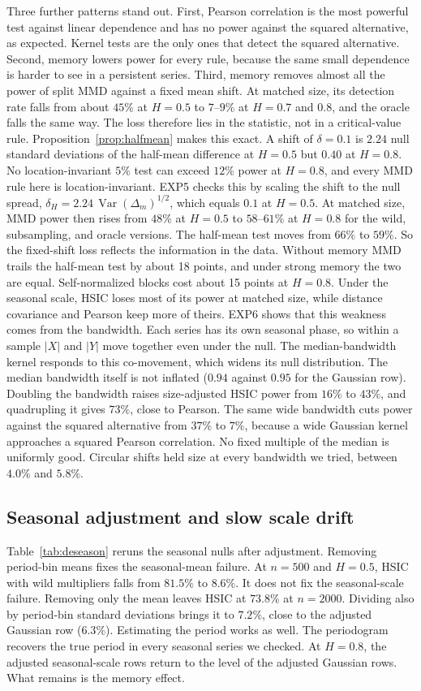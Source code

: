 \documentclass[11pt]{article}
\theoremstyle{remark}
\newcommand{\Var}{\operatorname{Var}}
\begin{document}
Three further patterns stand out. First, Pearson correlation is the most powerful test against linear dependence and has no power against the squared alternative, as expected. Kernel tests are the only ones that detect the squared alternative. Second, memory lowers power for every rule, because the same small dependence is harder to see in a persistent series. Third, memory removes almost all the power of split MMD against a fixed mean shift. At matched size, its detection rate falls from about $45\%$ at $H=0.5$ to $7$--$9\%$ at $H=0.7$ and $0.8$, and the oracle falls the same way. The loss therefore lies in the statistic, not in a critical-value rule. Proposition~\ref{prop:halfmean} makes this exact. A shift of $\delta=0.1$ is $2.24$ null standard deviations of the half-mean difference at $H=0.5$ but $0.40$ at $H=0.8$. No location-invariant $5\%$ test can exceed $12\%$ power at $H=0.8$, and every MMD rule here is location-invariant. EXP5 checks this by scaling the shift to the null spread, $\delta_H=2.24\,\Var(\Delta_m)^{1/2}$, which equals $0.1$ at $H=0.5$. At matched size, MMD power then rises from $48\%$ at $H=0.5$ to $58$--$61\%$ at $H=0.8$ for the wild, subsampling, and oracle versions. The half-mean test moves from $66\%$ to $59\%$. So the fixed-shift loss reflects the information in the data. Without memory MMD trails the half-mean test by about 18 points, and under strong memory the two are equal. Self-normalized blocks cost about 15 points at $H=0.8$. Under the seasonal scale, HSIC loses most of its power at matched size, while distance covariance and Pearson keep more of theirs. EXP6 shows that this weakness comes from the bandwidth. Each series has its own seasonal phase, so within a sample $|X|$ and $|Y|$ move together even under the null. The median-bandwidth kernel responds to this co-movement, which widens its null distribution. The median bandwidth itself is not inflated ($0.94$ against $0.95$ for the Gaussian row). Doubling the bandwidth raises size-adjusted HSIC power from $16\%$ to $43\%$, and quadrupling it gives $73\%$, close to Pearson. The same wide bandwidth cuts power against the squared alternative from $37\%$ to $7\%$, because a wide Gaussian kernel approaches a squared Pearson correlation. No fixed multiple of the median is uniformly good. Circular shifts held size at every bandwidth we tried, between $4.0\%$ and $5.8\%$.

\subsection{Seasonal adjustment and slow scale drift}\label{sec:deseason}
Table~\ref{tab:deseason} reruns the seasonal nulls after adjustment. Removing period-bin means fixes the seasonal-mean failure. At $n=500$ and $H=0.5$, HSIC with wild multipliers falls from $81.5\%$ to $8.6\%$. It does not fix the seasonal-scale failure. Removing only the mean leaves HSIC at $73.8\%$ at $n=2000$. Dividing also by period-bin standard deviations brings it to $7.2\%$, close to the adjusted Gaussian row ($6.3\%$). Estimating the period works as well. The periodogram recovers the true period in every seasonal series we checked. At $H=0.8$, the adjusted seasonal-scale rows return to the level of the adjusted Gaussian rows. What remains is the memory effect.
\end{document}
